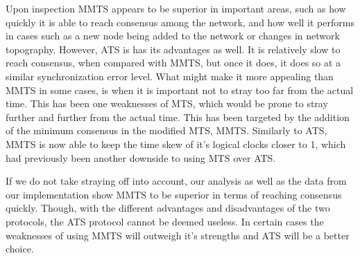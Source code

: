 \documentclass[a4paper,12pt]{article}
\begin{document}
Upon inspection MMTS appears to be superior in important areas, such as how quickly it is able to reach consensus among the network, and how well it performs in cases such as a new node being added to the network or changes in network topography. However, ATS is has its advantages as well. It is relatively slow to reach consensus, when compared with MMTS, but once it does, it does so at a similar synchronization error level. 
What might make it more appealing than MMTS in some cases, is when it is important not to stray too far from the actual time. 
This has been one weaknesses of MTS, which would be prone to stray further and further from the actual time. This has been targeted by the addition of the minimum consensus in the modified MTS, MMTS. Similarly to ATS, MMTS is now able to keep the time skew of it's logical clocks closer to 1, which had previously been another downside to using MTS over ATS.

If we do not take straying off into account, our analysis as well as the data from our implementation show MMTS to be superior in terms of reaching consensus quickly. Though, with the different advantages and disadvantages of the two protocols, the ATS protocol cannot be deemed useless. In certain cases the weaknesses of using MMTS will outweigh it's strengths and ATS will be a better choice.






\end{document}
